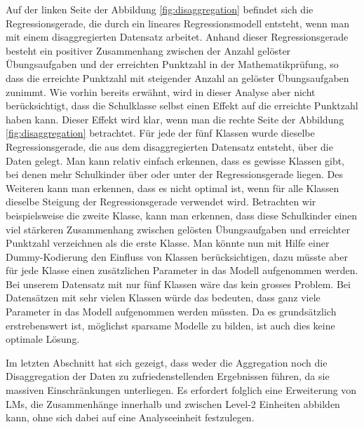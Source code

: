 \documentclass[12pt]{article}\usepackage[]{graphicx}\usepackage[]{color}
\begin{document}
Auf der linken Seite der Abbildung \ref{fig:disaggregation} befindet sich die Regressionsgerade, die durch ein lineares Regressionsmodell entsteht, wenn man mit einem disaggregierten Datensatz arbeitet. Anhand dieser Regressionsgerade besteht ein positiver Zusammenhang zwischen der Anzahl gelöster Übungsaufgaben und der erreichten Punktzahl in der Mathematikprüfung, so dass die erreichte Punktzahl mit steigender Anzahl an gelöster Übungsaufgaben zunimmt. Wie vorhin bereits erwähnt, wird in dieser Analyse aber nicht berücksichtigt, dass die Schulklasse selbst einen Effekt auf die erreichte Punktzahl haben kann. Dieser Effekt wird klar, wenn man die rechte Seite der Abbildung \ref{fig:disaggregation} betrachtet. Für jede der fünf Klassen wurde dieselbe Regressionsgerade, die aus dem disaggregierten Datensatz entsteht, über die Daten gelegt. Man kann relativ einfach erkennen, dass es gewisse Klassen gibt, bei denen mehr Schulkinder über oder unter der Regressionsgerade liegen. Des Weiteren kann man erkennen, dass es nicht optimal ist, wenn für alle Klassen dieselbe Steigung der Regressionsgerade verwendet wird. Betrachten wir beispielsweise die zweite Klasse, kann man erkennen, dass diese Schulkinder einen viel stärkeren Zusammenhang zwischen gelösten Übungsaufgaben und erreichter Punktzahl verzeichnen als die erste Klasse. Man könnte nun mit Hilfe einer Dummy-Kodierung den Einfluss von Klassen berücksichtigen, dazu müsste aber für jede Klasse einen zusätzlichen Parameter in das Modell aufgenommen werden. Bei unserem Datensatz mit nur fünf Klassen wäre das kein grosses Problem. Bei Datensätzen mit sehr vielen Klassen würde das bedeuten, dass ganz viele Parameter in das Modell aufgenommen werden müssten. Da es grundsätzlich erstrebenswert ist, möglichst sparsame Modelle zu bilden, ist auch dies keine optimale Lösung. 

Im letzten Abschnitt hat sich gezeigt, dass weder die Aggregation noch die Disaggregation der Daten zu zufriedenstellenden Ergebnissen führen, da sie massiven Einschränkungen unterliegen. Es erfordert folglich eine Erweiterung von LMs, die Zusammenhänge innerhalb und zwischen Level-2 Einheiten abbilden kann, ohne sich dabei auf eine Analyseeinheit festzulegen.
\end{document}

